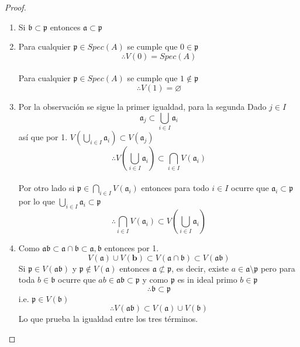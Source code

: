 \documentclass{article}
\begin{document}
\begin{proof}
    \begin{enumerate}
        \item Si $\mathfrak{b} \subset \mathfrak{p}$ entonces $\mathfrak{a} \subset \mathfrak{p}$
    
        \item Para cualquier $\mathfrak{p} \in Spec(A)$ se cumple que $0 \in \mathfrak{p}$
        $$\therefore V(0)=Spec(A)$$
        \\
        Para cualquier $\mathfrak{p} \in Spec(A)$ se cumple que $1 \notin \mathfrak{p}$
        $$\therefore V(1)=\varnothing$$

        \item Por la observación se sigue la primer igualdad, para la segunda 
        Dado $j\in I $ 
        $$\mathfrak{a}_j \subset \bigcup_{i\in I} \mathfrak{a}_i$$ así que por 1.
        $V(\bigcup_{i\in I}\mathfrak{a}_i) \subset V(\mathfrak{a}_j)$
        $$\therefore V(\bigcup_{i\in I}\mathfrak{a}_i) \subset \bigcap_{i \in I} V(\mathfrak{a}_i)$$
        \\
        Por otro lado si $\mathfrak{p} \in \bigcap_{i \in I} V(\mathfrak{a}_i)$ entonces
        para todo $i\in I$ ocurre que $\mathfrak{a}_i \subset \mathfrak{p}$\\
        por lo que $\bigcup_{i\in I} \mathfrak{a}_i \subset \mathfrak{p}$
        $$\therefore \bigcap_{i \in I} V(\mathfrak{a}_i) \subset V(\bigcup_{i\in I}\mathfrak{a}_i)$$

        
        \item Como $\mathfrak{a} \mathfrak{b} \subset \mathfrak{a}\cap \mathfrak{b}\subset \mathfrak{a}, \mathfrak{b}$ entonces por 1.
        $$V(\mathfrak{a}) \cup V(\mathbf{b}) \subset V(\mathfrak{a}\cap \mathfrak{b}) \subset V(\mathfrak{a} \mathfrak{b})$$
        Si $\mathfrak{p} \in V(\mathfrak{a} \mathfrak{b})$ y $\mathfrak{p}\notin V(\mathfrak{a})$ entonces $\mathfrak{a} \not\subset \mathfrak{p}$,
        es decir, existe $a\in \mathfrak{a} \setminus \mathfrak{p}$ pero para toda $b \in \mathfrak{b}$ ocurre que
        $ab \in \mathfrak{a} \mathfrak{b} \subset \mathfrak{p}$ y como $\mathfrak{p}$ es in ideal primo $b \in \mathfrak{p}$
        $$\therefore \mathfrak{b} \subset \mathfrak{p}$$ i.e. $\mathfrak{p} \in V(\mathfrak{b})$
        $$\therefore V(\mathfrak{a} \mathfrak{b}) \subset V(\mathfrak{a}) \cup V(\mathfrak{b})$$
        Lo que prueba la igualdad entre los tres términos.
    \end{enumerate}
\end{proof}
\end{document}
